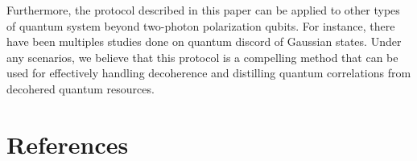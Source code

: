 \documentclass[%
 reprint,
 amsmath,amssymb,
 aps,
]{revtex4-1}
\begin{document}
Furthermore, the protocol described in this paper can be applied to other types of quantum system beyond two-photon polarization qubits. For instance, there have been multiples studies done on quantum discord of Gaussian states. Under any scenarios, we believe that this protocol is a compelling method that can be used for effectively handling decoherence and distilling quantum correlations from decohered quantum resources. 

\section{References}
\lipsum[1-3]
\end{document}
